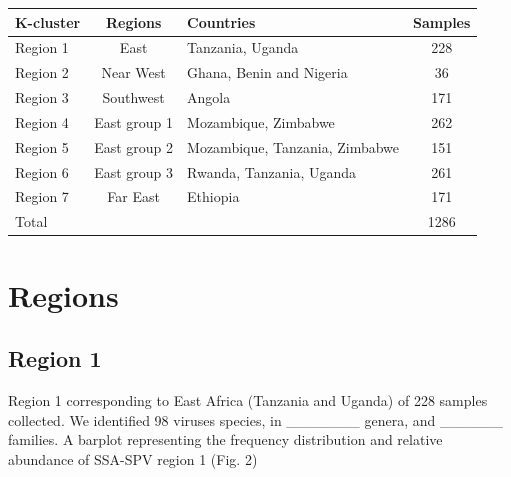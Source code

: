 \documentclass{article}
\begin{document}
\begin{table}[h!]
\begin{tabular}{lclc}
\hline \hline
K-cluster  & Regions      	& Countries                      			& Samples \\ \hline
Region 1  & East           	& Tanzania, Uganda                			& 228        \\
Region 2  & Near West      & Ghana, Benin and Nigeria      		& 36          \\
Region 3  & Southwest      & Angola                         				& 171        \\
Region 4  & East group 1   & Mozambique, Zimbabwe           		& 262         \\
Region 5  & East group 2   & Mozambique, Tanzania, Zimbabwe 	& 151         \\
Region 6  & East group 3   & Rwanda, Tanzania, Uganda       		& 261         \\
Region 7  & Far East       	& Ethiopia                      	 			& 171         \\ 
Total     	  &                	&                                				& 1286       \\  
\hline \hline
\end{tabular}
\end{table}

 

\section{Regions}



\subsection{Region 1}

Region 1 corresponding to East Africa (Tanzania and Uganda) of 228 samples collected. We identified 98 viruses species, in \_\_\_\_\_\_\_ genera, and \_\_\_\_\_\_ families.  A barplot representing the frequency distribution and relative abundance of SSA-SPV region 1 (Fig. 2)
\end{document}
